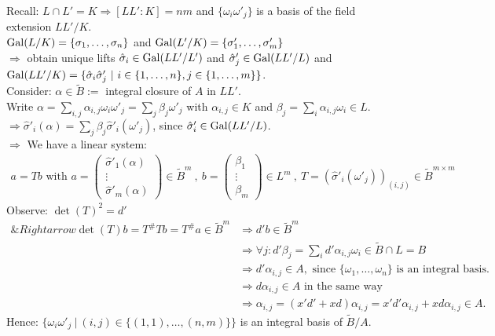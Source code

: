\begin{Bew}
Recall: $L \cap L' =K \Rightarrow [LL' :K]=nm$ and $\{\omega_i\omega'_j\}$ is a basis of the field extension $LL' / K$.\\
$\operatorname{Gal}(L/K)=\{\sigma_1, \dots, \sigma_n\}$ and $\operatorname{Gal}(L'/K) = \{\sigma'_1, \dots, \sigma'_m\}$\\
$\Rightarrow$ obtain unique lifts $\hat{\sigma}_i \in \operatorname{Gal}(LL'/L')$ and $\hat{\sigma}'_j \in \operatorname{Gal}(LL'/L)$ and $\Gal(LL'/K)=\{\hat{\sigma}_i \hat{\sigma}'_j \ | \ i \in \{1, \dots, n \}, j \in \{1, \dots, m\}\}$.\\
Consider: $\alpha \in \tilde{B}:= $ integral closure of $A$ in $LL'$.\\
Write $\alpha = \sum_{i,j} \alpha_{i,j} \omega_i \omega'_j = \sum_j \beta_j \omega'_j$ with $\alpha_{i,j} \in K$ and $\beta_j= \sum_i \alpha_{i,j} \omega_i \in L$.\\
$\Rightarrow \hat{\sigma}'_i(\alpha) = \sum_j \beta_j \hat{\sigma}'_i(\omega'_j)$, since $\hat{\sigma}'_i \in \operatorname{Gal}(LL'/L)$.\\
$\Rightarrow$ We have a linear system:
\begin{align*}
a=Tb \text{ with } a = \begin{pmatrix}
\hat{\sigma}'_1(\alpha)\\
\vdots\\
\hat{\sigma}'_m(\alpha)
\end{pmatrix}
\in \tilde{B}^m \ , \ b = \begin{pmatrix}
\beta_1\\
\vdots\\
\beta_m
\end{pmatrix} \in L^m
\ ,\ T=(\hat{\sigma}'_i(\omega'_j))_{(i,j)} \in \tilde{B}^{m \times m}
\end{align*}
Observe: $\det(T)^2 = d'$
\begin{align*}
\&Rightarrow \det(T) b = T^{\#} T b = T^{\#}a \in \tilde{B}^m &\Rightarrow d'b \in \tilde{B}^m\\
&\Rightarrow \forall j: d' \beta_j = \sum_i d'\alpha_{i,j} \omega_i \in \tilde{B} \cap L =B\\
&\Rightarrow d' \alpha_{i,j} \in A, \text{ since } \{\omega_1, \dots, \omega_n\} \text{ is an integral basis}.\\
&\Rightarrow d\alpha_{i,j} \in A \text{ in the same way}\\
&\Rightarrow \alpha_{i,j} = (x'd'+xd) \alpha_{i,j}=x'd'\alpha_{i,j}+xd\alpha_{i,j} \in A.
\end{align*}
Hence: $\{\omega_i \omega'_j \ | \ (i,j) \in \{(1,1), \dots, (n,m)\}\}$ is an integral basis of $\tilde{B}/A$.\\

\end{Bew}
